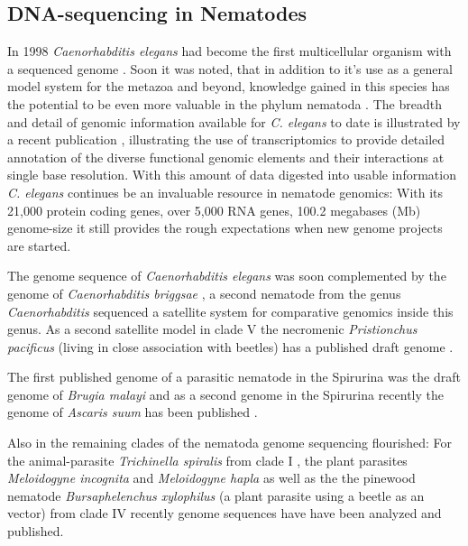 \subsection{DNA-sequencing in Nematodes}
\label{sec:dna-sequ-nemat}

In 1998 \textit{Caenorhabditis elegans} had become the first
multicellular organism with a sequenced genome
\cite{pmid9851916}. Soon it was noted, that in addition to it's use as
a general model system for the metazoa and beyond, knowledge gained in
this species has the potential to be even more valuable in the phylum
nematoda \cite{blaxter_caenorhabditis_1998}. The breadth and detail of
genomic information available for \textit{C. elegans} to date is
illustrated by a recent publication \cite{pmid21177976}, illustrating
the use of transcriptomics to provide detailed annotation of the
diverse functional genomic elements and their interactions at single
base resolution. With this amount of data digested into usable
information \textit{C. elegans} continues be an invaluable resource in
nematode genomics: With its 21,000 protein coding genes, over 5,000
RNA genes, 100.2 megabases (Mb) genome-size it still provides the
rough expectations when new genome projects are started.

The genome sequence of \textit{Caenorhabditis elegans} was soon
complemented by the genome of \textit{Caenorhabditis briggsae}
\cite{stein_genome_2003}, a second nematode from the genus
\textit{Caenorhabditis} sequenced a satellite system for comparative
genomics inside this genus. As a second satellite model in clade V
the necromenic \textit{Pristionchus pacificus} (living in close
association with beetles) has a published draft genome
\cite{pmid18806794}. 

The first published genome of a parasitic nematode in the Spirurina
was the draft genome of \textit{Brugia malayi}
\cite{ghedin_draft_2007} and as a second genome in the Spirurina
recently the genome of \textit{Ascaris suum} has been published
\cite{pmid22031327}.

Also in the remaining clades of the nematoda genome sequencing
flourished: For the animal-parasite \textit{Trichinella spiralis} from
clade I \cite{pmid21336279}, the plant parasites \textit{Meloidogyne
  incognita} \cite{pmid18660804} and \textit{Meloidogyne hapla}
\cite{pmid18809916} as well as the the pinewood nematode
\textit{Bursaphelenchus xylophilus} \cite{pmid21909270} (a plant
parasite using a beetle as an vector) from clade IV recently genome
sequences have have been analyzed and published.

